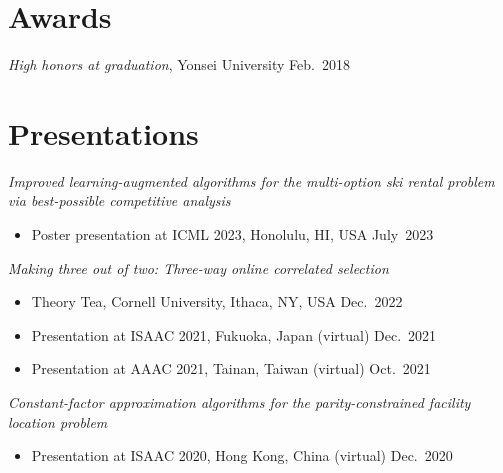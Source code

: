 \documentclass{article}
\newcommand{\killinitspace}{-0.7em}
\begin{document}

\section{Awards}
\textsl{High honors at graduation}, Yonsei University \hfill Feb.~2018

\section{Presentations}
\textsl{Improved learning-augmented algorithms for the multi-option ski rental problem via best-possible competitive analysis}
\vspace{\killinitspace}
\begin{itemize}
\item Poster presentation at ICML 2023, Honolulu, HI, USA \hfill July~2023
\end{itemize}

\textsl{Making three out of two: Three-way online correlated selection}
\vspace{\killinitspace}
\begin{itemize}
\item Theory Tea, Cornell University, Ithaca, NY, USA \hfill Dec.~2022
\item Presentation at ISAAC 2021, Fukuoka, Japan (virtual) \hfill Dec.~2021
\item Presentation at AAAC 2021, Tainan, Taiwan (virtual) \hfill Oct.~2021
\end{itemize}

\textsl{Constant-factor approximation algorithms for the parity-constrained facility location problem}
\vspace{\killinitspace}
\begin{itemize}
\item Presentation at ISAAC 2020, Hong Kong, China (virtual) \hfill Dec.~2020
\end{itemize}

\end{document}
